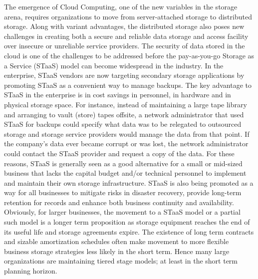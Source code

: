 \documentclass[11pt]{article}
\begin{document}
The emergence of Cloud Computing, one of the new variables in the storage 
arena, requires organizations to move from server-attached storage to 
distributed storage. Along with variant advantages, the distributed storage 
also poses new challenges in creating both a secure and reliable data 
storage and access facility over insecure or unreliable service providers. 
The security of data stored in the cloud is one of the challenges to be 
addressed before the pay-as-you-go Storage as a Service (STaaS) model can 
become widespread in the industry. In the enterprise, STaaS vendors are now 
targeting secondary storage applications by promoting STaaS as a convenient 
way to manage backups. The key advantage to STaaS in the enterprise is in 
cost savings in personnel, in hardware and in physical storage space. For 
instance, instead of maintaining a large tape library and arranging to vault 
(store) tapes offsite, a network administrator that used STaaS for backups 
could specify what data was to be relegated to outsourced storage and 
storage service providers would manage the data from that point. If the 
company's data ever became corrupt or was lost, the network administrator 
could contact the STaaS provider and request a copy of the data. For these 
reasons, STaaS is generally seen as a good alternative for a small or 
mid-sized business that lacks the capital budget and/or technical personnel 
to implement and maintain their own storage infrastructure. STaaS is also 
being promoted as a way for all businesses to mitigate risks in disaster 
recovery, provide long-term retention for records and enhance both business 
continuity and availability. Obviously, for larger businesses, the movement 
to a STaaS model or a partial such model is a longer term proposition as 
storage equipment reaches the end of its useful life and storage agreements 
expire. The existence of long term contracts and sizable amortization 
schedules often make movement to more flexible business storage strategies 
less likely in the short term. Hence many large organizations are maintaining 
tiered stage models; at least in the short term planning horizon. 
\end{document}

